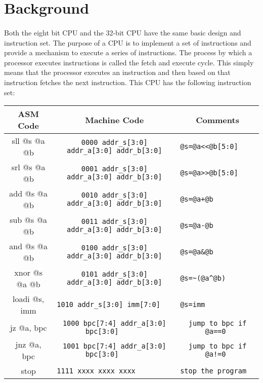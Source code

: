 \documentclass[11pt,letterpaper,final]{article}
\begin{document}
\section{ Background }
\paragraph{}
Both the eight bit CPU and the 32-bit CPU have the same basic design and instruction set. The purpose of a CPU is to implement a set of
instructions and provide a mechanism to execute a series of instructions. 
The process by which a processor executes instructions is called the fetch and
execute cycle.  This simply means that the processor executes an
instruction and then based on that instruction fetches the next instruction. 
This CPU has the following instruction set: \cite{instructions}

\begin{center} 
\begin{small}
\begin{tabular}{ | c | c | c | } 
\hline ASM Code      & Machine Code                             & Comments      
      \\
\hline sll @s @a @b  & \verb|0000 addr_s[3:0] addr_a[3:0] addr_b[3:0]| &
\verb|@s=@a<<@b[5:0]       |\\ 
\hline srl @s @a @b  & \verb|0001 addr_s[3:0] addr_a[3:0] addr_b[3:0]| &
\verb|@s=@a>>@b[5:0]       |\\ 
\hline add @s @a @b  & \verb|0010 addr_s[3:0] addr_a[3:0] addr_b[3:0]| &
\verb|@s=@a+@b             |\\ 
\hline sub @s @a @b  & \verb|0011 addr_s[3:0] addr_a[3:0] addr_b[3:0]| &
\verb|@s=@a-@b             |\\ 
\hline and @s @a @b  & \verb|0100 addr_s[3:0] addr_a[3:0] addr_b[3:0]| &
\verb|@s=@a&@b             |\\ 
\hline xnor @s @a @b & \verb|0101 addr_s[3:0] addr_a[3:0] addr_b[3:0]| &
\verb|@s=~(@a^@b)          |\\ 
\hline loadi @s, imm & \verb|1010 addr_s[3:0] imm[7:0]               | &
\verb|@s=imm               |\\ 
\hline jz @a, bpc    & \verb|1000 bpc[7:4] addr_a[3:0] bpc[3:0]      | &
\verb|jump to bpc if @a==0 |\\ 
\hline jnz @a, bpc   & \verb|1001 bpc[7:4] addr_a[3:0] bpc[3:0]      | &
\verb|jump to bpc if @a!=0 |\\ 
\hline stop          & \verb|1111 xxxx xxxx xxxx                     | &
\verb|stop the program     |\\ 
\hline
\end{tabular}
\end{small}
\end{center}
\end{document}
